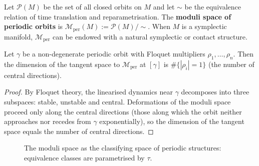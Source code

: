 \begin{definition}\label{def:periodic_orbit_moduli}
Let $\mathcal{P}(M)$ be the set of all closed orbits on $M$ and let $\sim$ be the equivalence relation of time translation and reparametrisation. The \textbf{moduli space of periodic orbits} is $\mathcal{M}_{\text{per}}(M):=\mathcal{P}(M)/\sim$. When $M$ is a symplectic manifold, $\mathcal{M}_{\text{per}}$ can be endowed with a natural symplectic or contact structure.
\end{definition}

\begin{proposition}\label{prop:moduli_tangent}
Let $\gamma$ be a non-degenerate periodic orbit with Floquet multipliers $\rho_1,\dots,\rho_n$. Then the dimension of the tangent space to $\mathcal{M}_{\text{per}}$ at $[\gamma]$ is $\#\{|\rho_i|=1\}$ (the number of central directions).
\end{proposition}

\begin{proof}
By Floquet theory, the linearised dynamics near $\gamma$ decomposes into three subspaces: stable, unstable and central. Deformations of the moduli space proceed only along the central directions (those along which the orbit neither approaches nor recedes from $\gamma$ exponentially), so the dimension of the tangent space equals the number of central directions.
\end{proof}



\begin{figure}[htbp]
\centering
{}
\caption{The moduli space as the classifying space of periodic structures: equivalence classes are parametrised by $\tau$.}
\label{fig:moduli_space_periodic}
\end{figure}

